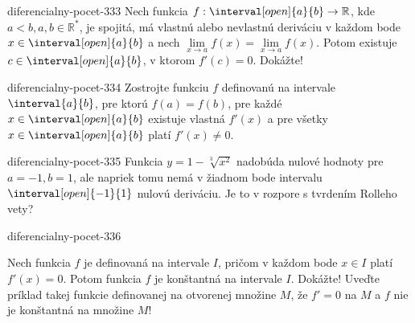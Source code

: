 \begin{defproblem}{diferencialny-pocet-333}
Nech funkcia $f:\interval[open]{a}{b}\rightarrow\mathbb{R}$, kde
$a<b,a,b\in\mathbb{R^*}$, je spojitá, má vlastnú alebo nevlastnú deriváciu v
každom bode $x\in \interval[open]{a}{b}$ a nech $\lim\limits_{x\rightarrow
a}f(x)=\lim\limits_{x\rightarrow a}f(x)$. Potom existuje $c\in
\interval[open]{a}{b}$, v ktorom $f'(c)=0$. Dokážte!
\end{defproblem}

\begin{defproblem}{diferencialny-pocet-334}
Zostrojte funkciu $f$ definovanú na intervale $\interval{a}{b}$, pre ktorú
$f(a)=f(b)$, pre každé $x\in \interval[open]{a}{b}$ existuje vlastná $f'(x)$ a
pre všetky $x\in \interval[open]{a}{b}$ platí $f'(x)\neq 0$.
\end{defproblem}

\begin{defproblem}{diferencialny-pocet-335}
Funkcia $y=1-\sqrt[3]{x^2}$ nadobúda nulové hodnoty pre $a=-1,b=1$, ale napriek
tomu nemá v žiadnom bode intervalu $\interval[open]{-1}{1}$ nulovú deriváciu. Je
to v rozpore s tvrdením Rolleho vety?
\end{defproblem}

\begin{defproblem}{diferencialny-pocet-336}
\begin{tasks}
\task
  Nech funkcia $f$ je definovaná na intervale $I$, pričom v každom bode $x\in I$
  platí $f'(x)=0$. Potom funkcia $f$ je konštantná na intervale $I$. Dokážte!
\task
  Uveďte príklad takej funkcie definovanej na otvorenej množine $M$, že $f'=0$
  na $M$ a $f$ nie je konštantná na množine $M$!
\end{tasks}
\end{defproblem}

